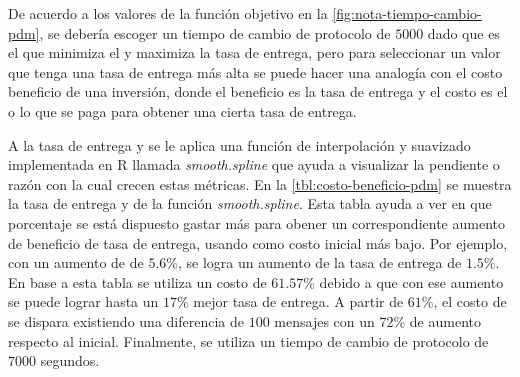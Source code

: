 De acuerdo a los valores de la función objetivo en la
\ref{fig:nota-tiempo-cambio-pdm}, se debería escoger un tiempo de cambio de
protocolo de $5000$ dado que es el que minimiza el \overhead{} y maximiza la
tasa de entrega, pero para seleccionar un valor que tenga una tasa de entrega
más alta se puede hacer una analogía con el costo beneficio de una inversión,
donde el beneficio es la tasa de entrega y el costo es el \overhead{} o lo que
se paga para obtener una cierta tasa de entrega.

A la tasa de entrega y \overhead{} se le aplica una función de interpolación y
suavizado implementada en R llamada \textit{smooth.spline} que ayuda a
visualizar la pendiente o razón con la cual crecen estas métricas. En la
\ref{tbl:costo-beneficio-pdm} se muestra la tasa de entrega y \overhead{} de la
función \textit{smooth.spline}.  Esta tabla ayuda a ver en que porcentaje se
está dispuesto gastar más \overhead{} para obener un correspondiente aumento de
beneficio de tasa de entrega, usando como costo inicial \overhead{} más bajo.
Por ejemplo, con un aumento de \overhead{} de $5.6\%$, se logra un aumento de
la tasa de entrega de $1.5\%$. En base a esta tabla se utiliza un costo de
$61.57\%$  debido a que con ese aumento se puede lograr hasta un $17\%$ mejor
tasa de entrega. A partir de $61\%$, el costo de \overhead{} se dispara
existiendo una diferencia de $100$ mensajes con un $72\%$ de aumento respecto al
\overhead{} inicial. Finalmente, se utiliza un tiempo de cambio de protocolo de
$7000$ segundos.


